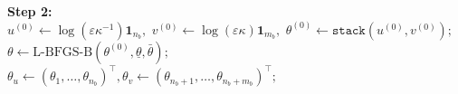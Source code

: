 \begin{algorithm}[tbp]
\vspace{.2cm}
\noindent \textbf{Step 2:} \textcolor{black}{}\\

\nl  $u^{(0)}\gets \log(\varepsilon\kappa^{-1}) \mathbf 1_{n_b},$ $v^{(0)} \gets \log(\varepsilon\kappa) \mathbf 1_{m_b},$ $\theta^{(0)} \gets \texttt{stack}(u^{(0)}, v^{(0)});$\\
\nl   $\theta \gets \text{L-BFGS-B}(\theta^{(0)}, \underline{\theta}, \bar{\theta});$\\
\nl   $\theta_u \gets (\theta_1, \ldots, \theta_{n_b})^\top, \theta_v \gets(\theta_{n_b+1}, \ldots, \theta_{n_b+m_b})^\top;$\\
\\
\\
\nl   {}
\end{algorithm}



